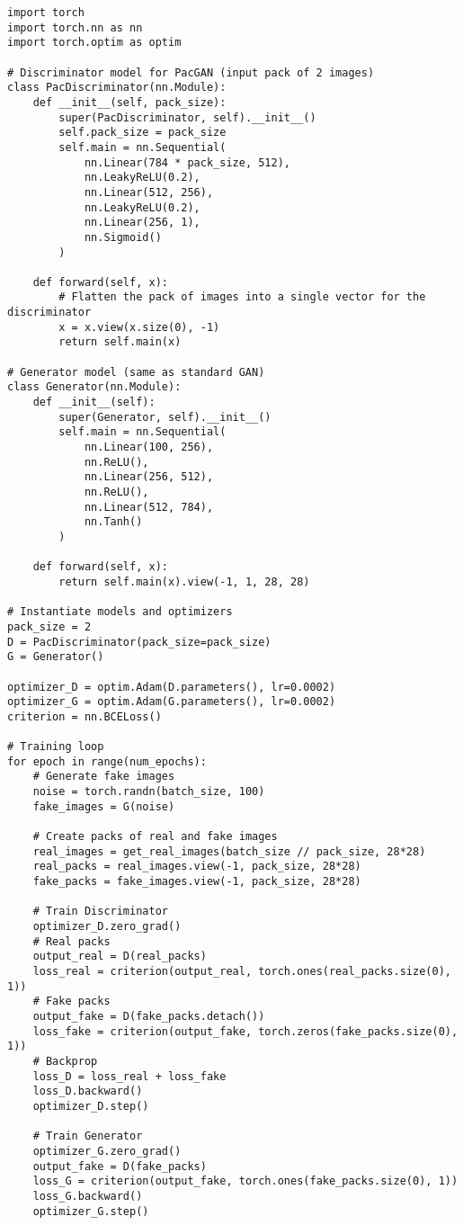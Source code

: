\begin{lstlisting}[style=python]
import torch
import torch.nn as nn
import torch.optim as optim

# Discriminator model for PacGAN (input pack of 2 images)
class PacDiscriminator(nn.Module):
    def __init__(self, pack_size):
        super(PacDiscriminator, self).__init__()
        self.pack_size = pack_size
        self.main = nn.Sequential(
            nn.Linear(784 * pack_size, 512),
            nn.LeakyReLU(0.2),
            nn.Linear(512, 256),
            nn.LeakyReLU(0.2),
            nn.Linear(256, 1),
            nn.Sigmoid()
        )
    
    def forward(self, x):
        # Flatten the pack of images into a single vector for the discriminator
        x = x.view(x.size(0), -1)
        return self.main(x)

# Generator model (same as standard GAN)
class Generator(nn.Module):
    def __init__(self):
        super(Generator, self).__init__()
        self.main = nn.Sequential(
            nn.Linear(100, 256),
            nn.ReLU(),
            nn.Linear(256, 512),
            nn.ReLU(),
            nn.Linear(512, 784),
            nn.Tanh()
        )
    
    def forward(self, x):
        return self.main(x).view(-1, 1, 28, 28)

# Instantiate models and optimizers
pack_size = 2
D = PacDiscriminator(pack_size=pack_size)
G = Generator()

optimizer_D = optim.Adam(D.parameters(), lr=0.0002)
optimizer_G = optim.Adam(G.parameters(), lr=0.0002)
criterion = nn.BCELoss()

# Training loop
for epoch in range(num_epochs):
    # Generate fake images
    noise = torch.randn(batch_size, 100)
    fake_images = G(noise)

    # Create packs of real and fake images
    real_images = get_real_images(batch_size // pack_size, 28*28)
    real_packs = real_images.view(-1, pack_size, 28*28)
    fake_packs = fake_images.view(-1, pack_size, 28*28)

    # Train Discriminator
    optimizer_D.zero_grad()
    # Real packs
    output_real = D(real_packs)
    loss_real = criterion(output_real, torch.ones(real_packs.size(0), 1))
    # Fake packs
    output_fake = D(fake_packs.detach())
    loss_fake = criterion(output_fake, torch.zeros(fake_packs.size(0), 1))
    # Backprop
    loss_D = loss_real + loss_fake
    loss_D.backward()
    optimizer_D.step()

    # Train Generator
    optimizer_G.zero_grad()
    output_fake = D(fake_packs)
    loss_G = criterion(output_fake, torch.ones(fake_packs.size(0), 1))
    loss_G.backward()
    optimizer_G.step()
\end{lstlisting}

